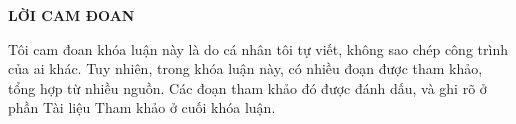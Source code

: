 \documentclass[../../../thesis]{subfiles}
\begin{document}
\begin{center}
    \textbf{\large
        LỜI CAM ĐOAN
    }
\end{center}

Tôi cam đoan khóa luận này là do cá nhân tôi tự viết, không sao chép công trình
của ai khác. Tuy nhiên, trong khóa luận này, có nhiều đoạn được tham khảo, tổng
hợp từ nhiều nguồn. Các đoạn tham khảo đó được đánh dấu, và ghi rõ ở phần Tài
liệu Tham khảo ở cuối khóa luận.

\thispagestyle{empty}

\clearpage
\end{document}

